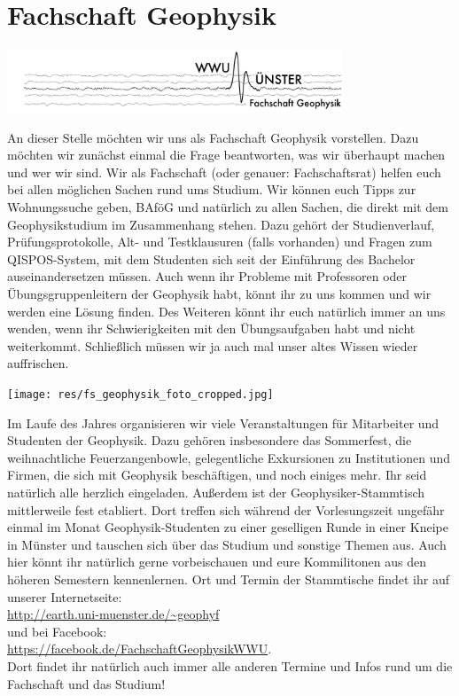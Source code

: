 
\section{Fachschaft Geophysik}
\begin{center}
\vspace{-0.5cm}
\includegraphics[width=0.75\textwidth]{res/fs_geophysik_logo.png}
\vspace{-0.3cm}
\end{center}
\begin{multicols*}{2}
An dieser Stelle möchten wir uns als Fachschaft Geophysik vorstellen. Dazu möchten wir zunächst einmal die Frage beantworten, was wir überhaupt machen und wer wir sind. Wir als Fachschaft (oder genauer: Fachschaftsrat) helfen euch bei allen möglichen Sachen rund ums Studium. Wir können euch Tipps zur Wohnungssuche geben, BAföG und natürlich zu allen Sachen, die direkt mit dem Geophysikstudium im Zusammenhang stehen. Dazu gehört der Studienverlauf, Prüfungsprotokolle, Alt- und Testklausuren (falls vorhanden) und Fragen zum QISPOS-System, mit dem Studenten sich seit der Einführung des Bachelor auseinandersetzen müssen. Auch wenn ihr Probleme mit Professoren oder Übungsgruppenleitern der Geophysik habt, könnt ihr zu uns kommen und wir werden eine Lösung finden. Des Weiteren könnt ihr euch natürlich immer an uns wenden, wenn ihr Schwierigkeiten mit den Übungsaufgaben habt und nicht weiterkommt. Schließlich müssen wir ja auch mal unser altes Wissen wieder auffrischen.

\begin{center}
\texttt{[image: res/fs\_geophysik\_foto\_cropped.jpg]}
\end{center}

Im Laufe des Jahres organisieren wir viele Veranstaltungen für Mitarbeiter und Studenten der Geophysik. Dazu gehören insbesondere das Sommerfest, die weihnachtliche Feuerzangenbowle, gelegentliche Exkursionen zu Institutionen und Firmen, die sich mit Geophysik beschäftigen, und noch einiges mehr. Ihr seid natürlich alle herzlich eingeladen. Außerdem ist der Geophysiker-Stammtisch mittlerweile fest etabliert. Dort treffen sich während der Vorlesungszeit ungefähr einmal im Monat Geophysik-Studenten zu einer geselligen Runde in einer Kneipe in Münster und tauschen sich über das Studium und sonstige Themen aus. Auch hier könnt ihr natürlich gerne vorbeischauen und eure Kommilitonen aus den höheren Semestern kennenlernen. Ort und Termin der Stammtische findet ihr auf unserer Internetseite:\\
\url{http://earth.uni-muenster.de/~geophyf}\\
und bei Facebook:\\
\url{https://facebook.de/FachschaftGeophysikWWU}.\\
Dort findet ihr natürlich auch immer alle anderen Termine und Infos rund um die Fachschaft und das Studium!


\end{multicols*}

